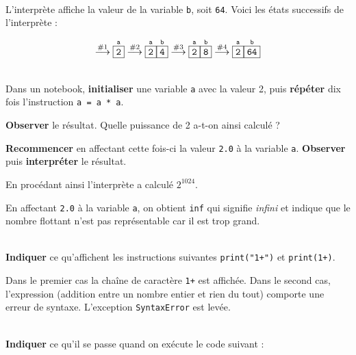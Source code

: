 \documentclass[a4paper,17pt]{extarticle}
\newenvironment{eleve}%
{\begin{activite}\color{noiramu}\\[-0.5cm]}
{\end{activite}}
\begin{document}
\begin{eleve}
        \end{eleve}\begin{reponse}
    L'interprète affiche la valeur de la variable \texttt{b}, soit
\texttt{64}. Voici les états successifs de l'interprète :

\[
\overset{\text{\#1}}\longrightarrow
\overset{\texttt{a}}{\fbox{\texttt{2}}}
\overset{\text{\#2}}\longrightarrow
\overset{\texttt{a}}{\fbox{\texttt{2}}}
\overset{\texttt{b}}{\fbox{\texttt{4}}}
\overset{\text{\#3}}\longrightarrow
\overset{\texttt{a}}{\fbox{\texttt{2}}}
\overset{\texttt{b}}{\fbox{\texttt{8}}}
\overset{\text{\#4}}\longrightarrow
\overset{\texttt{a}}{\fbox{\texttt{2}}}
\overset{\texttt{b}}{\fbox{\texttt{64}}}
\]

        \end{reponse}\begin{eleve}
    Dans un notebook, \textbf{initialiser} une variable \texttt{a} avec la
valeur 2, puis \textbf{répéter} dix fois l'instruction
\texttt{a\ =\ a\ *\ a}.

\textbf{Observer} le résultat. Quelle puissance de 2 a-t-on ainsi
calculé ?

\textbf{Recommencer} en affectant cette fois-ci la valeur \texttt{2.0} à
la variable \texttt{a}. \textbf{Observer} puis \textbf{interpréter} le
résultat.
        
        \end{eleve}\begin{reponse}
    En procédant ainsi l'interprète a calculé \(2^{1024}\).

En affectant \texttt{2.0} à la variable \texttt{a}, on obtient
\texttt{inf} qui signifie \emph{infini} et indique que le nombre
flottant n'est pas représentable car il est trop grand.

        \end{reponse}\begin{eleve}
    \textbf{Indiquer} ce qu'affichent les instructions suivantes
\texttt{print("1+")} et \texttt{print(1+)}.
        
        \end{eleve}\begin{reponse}
    Dans le premier cas la chaîne de caractère \texttt{1+} est affichée.
Dans le second cas, l'expression (addition entre un nombre entier et
rien du tout) comporte une erreur de syntaxe. L'exception
\texttt{SyntaxError} est levée.

        \end{reponse}\begin{eleve}
    \textbf{Indiquer} ce qu'il se passe quand on exécute le code suivant :


\end{eleve}
\end{document}
